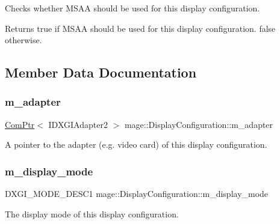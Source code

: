 Checks whether M\+S\+AA should be used for this display configuration.

\begin{DoxyReturn}{Returns}
{\ttfamily true} if M\+S\+AA should be used for this display configuration. {\ttfamily false} otherwise. 
\end{DoxyReturn}


\subsection{Member Data Documentation}
\hypertarget{structmage_1_1_display_configuration_a3a731fa68cb3924f0528115930073d77}{}\label{structmage_1_1_display_configuration_a3a731fa68cb3924f0528115930073d77} 
\subsubsection{\texorpdfstring{m\+\_\+adapter}{m\_adapter}}
{\footnotesize\ttfamily \hyperlink{namespacemage_ae74f374780900893caa5555d1031fd79}{Com\+Ptr}$<$ I\+D\+X\+G\+I\+Adapter2 $>$ mage\+::\+Display\+Configuration\+::m\+\_\+adapter\hspace{0.3cm}{\ttfamily [private]}}

A pointer to the adapter (e.\+g. video card) of this display configuration. \hypertarget{structmage_1_1_display_configuration_ac59d5e7c5553ef4842090bf1a83bd7ca}{}\label{structmage_1_1_display_configuration_ac59d5e7c5553ef4842090bf1a83bd7ca} 
\subsubsection{\texorpdfstring{m\+\_\+display\+\_\+mode}{m\_display\_mode}}
{\footnotesize\ttfamily D\+X\+G\+I\+\_\+\+M\+O\+D\+E\+\_\+\+D\+E\+S\+C1 mage\+::\+Display\+Configuration\+::m\+\_\+display\+\_\+mode\hspace{0.3cm}{\ttfamily [private]}}

The display mode of this display configuration. \hypertarget{structmage_1_1_display_configuration_a1d4de267f8edcd0044252b9658f426c3}{}\label{structmage_1_1_display_configuration_a1d4de267f8edcd0044252b9658f426c3} 
